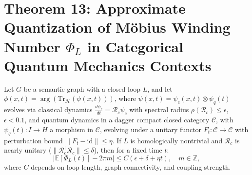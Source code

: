 \documentclass[12pt]{article}
\begin{document}
\section*{Theorem 13: Approximate Quantization of Möbius Winding Number \(\Phi_L\) in Categorical Quantum Mechanics Contexts}

\begin{theorem}
Let \(G\) be a semantic graph with a closed loop \(L\), and let \(\phi(x,t) = \arg(\text{Tr}_{\mathcal{H}}(\psi(x,t)))\), where \(\psi(x,t) = \psi_c(x,t) \otimes \psi_q(t)\) evolves via classical dynamics \(\frac{d\psi_c}{dt} = \mathcal{R}_c \psi_c\) with spectral radius \(\rho(\mathcal{R}_c) \leq \epsilon\), \(\epsilon < 0.1\), and quantum dynamics in a dagger compact closed category \(\mathcal{C}\), with \(\psi_q(t): I \to H\) a morphism in \(\mathcal{C}\), evolving under a unitary functor \(F_t: \mathcal{C} \to \mathcal{C}\) with perturbation bound \(\|F_t - \text{id}\| \leq \eta\). If \(L\) is homologically nontrivial and \(\mathcal{R}_c\) is nearly unitary (\(\|\mathcal{R}_c^\dagger \mathcal{R}_c\| \leq \delta\)), then for a fixed time \(t\):
\[
\left| \mathbb{E}[\Phi_L(t)] - 2\pi m \right| \leq C (\epsilon + \delta + \eta t), \quad m \in \mathbb{Z},
\]
where \(C\) depends on loop length, graph connectivity, and coupling strength.
\end{theorem}
\end{document}
